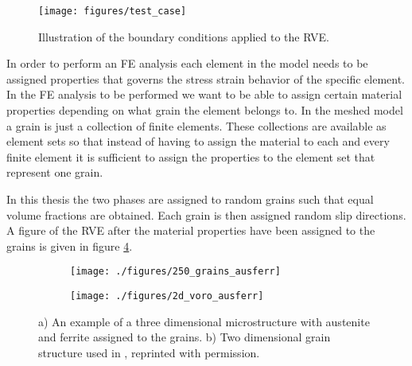 \documentclass[crystal_plast.tex]{subfiles}
\begin{document}
\begin{figure}[htpb!]
\centering
\texttt{[image: figures/test\_case]}
\caption{Illustration of the boundary conditions applied to the RVE.}
\label{fig:test_case_cryst}
\end{figure}

In order to perform an FE analysis each element in the model needs to be assigned properties that governs the stress strain behavior of the specific element. In the FE analysis to be performed we want to be able to assign certain material properties depending on what grain the element belongs to. In the meshed model a grain is just a collection of finite elements. These collections are available as element sets so that instead of having to assign the material to each and every finite element it is sufficient to assign the properties to the element set that represent one grain.

In this thesis the two phases are assigned to random grains such that equal volume fractions are obtained. Each grain is then assigned random slip directions. A figure of the RVE after the material properties have been assigned to the grains is given in figure \ref{fig:ausferr}. 


 \begin{figure}[htpb!]
\centering
\begin{subfigure}{.5\textwidth}
  \centering
  \texttt{[image: ./figures/250\_grains\_ausferr]}
  \caption{}
  \label{fig:ausferr_3d}
\end{subfigure}%
\begin{subfigure}{.6\textwidth}
  \centering
  \texttt{[image: ./figures/2d\_voro\_ausferr]}
  \caption{}
  \label{fig:ausferr_2d}
\end{subfigure}
\caption{a) An example of a three dimensional microstructure with austenite and ferrite assigned to the grains.  b) Two dimensional grain structure used in \cite{lillbacka2007multiscale}, reprinted with permission.}
\label{fig:ausferr}
\end{figure}
\end{document}
